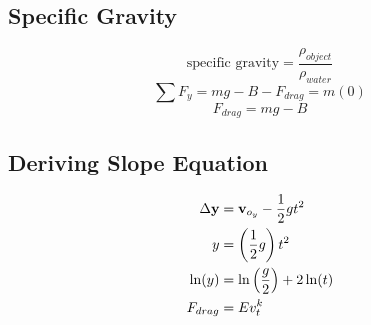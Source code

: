 \documentclass{article}
\begin{document}
\subsection{Specific Gravity}

\begin{equation}
	\text{specific gravity} = \frac{ \rho_{object} }{ \rho_{water} }
\end{equation}
\begin{equation}
	\sum F_y = mg - B - F_{drag} = m(0)
\end{equation}
\begin{equation}
	F_{drag} = mg - B
\end{equation}

\subsection{Deriving Slope Equation}

\begin{align*}
	\Delta \vect{y} & = \vect{v}_{o_y} - \frac{1}{2}gt^2 \\
	y & = \left( \frac{ 1 }{ 2 }g \right)t^2 \\
	\ln(y) & = \ln \left( \frac{ g }{ 2 } \right) + 2\ln(t) \\
	F_{drag} & = Ev_t^k
\end{align*}
\end{document}
